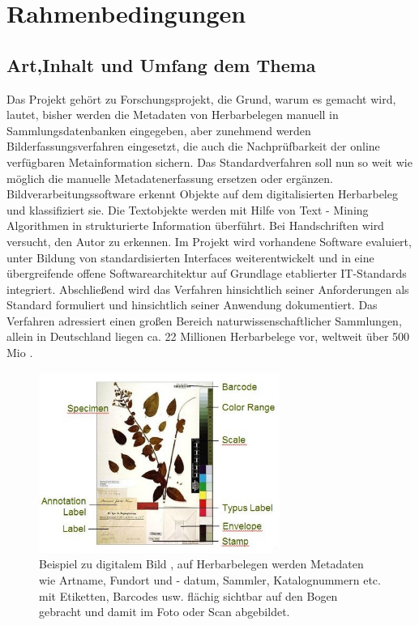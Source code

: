 \documentclass[10pt,a4paper]{report}
\begin{document}
\chapter{Rahmenbedingungen}
\section{Art,Inhalt und Umfang dem Thema}

Das Projekt gehört zu Forschungsprojekt, die Grund, warum es gemacht wird, lautet, bisher werden die Metadaten von Herbarbelegen manuell in Sammlungsdatenbanken eingegeben, aber zunehmend werden Bilderfassungsverfahren eingesetzt, die auch die Nachprüfbarkeit der online verfügbaren Metainformation sichern. Das Standardverfahren soll nun so weit wie möglich die manuelle Metadatenerfassung ersetzen oder ergänzen. Bildverarbeitungssoftware erkennt Objekte auf dem digitalisierten Herbarbeleg und klassifiziert sie. Die Textobjekte werden mit Hilfe von Text - Mining Algorithmen in strukturierte Information überführt. Bei Handschriften wird versucht, den Autor zu erkennen. Im Projekt wird vorhandene Software evaluiert, unter Bildung von standardisierten Interfaces weiterentwickelt und in eine übergreifende offene Softwarearchitektur auf Grundlage etablierter IT-Standards integriert. Abschließend wird das Verfahren hinsichtlich seiner Anforderungen als Standard formuliert und hinsichtlich seiner Anwendung dokumentiert. Das Verfahren adressiert einen großen Bereich naturwissenschaftlicher Sammlungen, allein in Deutschland liegen ca. 22 Millionen Herbarbelege vor, weltweit über 500 Mio \cite{1}.\\
\begin{figure}[htbp] 
	\centering
	\includegraphics[width=0.7\textwidth]{Herbarbeleg_Objekte.JPG}
	\caption{Beispiel zu digitalem Bild \cite{2}, auf Herbarbelegen werden Metadaten wie Artname, Fundort und - datum, Sammler, Katalognummern etc. mit Etiketten, Barcodes usw. flächig sichtbar auf den Bogen gebracht und damit im Foto oder Scan abgebildet.}
	\label{fig:Bild1}
\end{figure}
\end{document}
